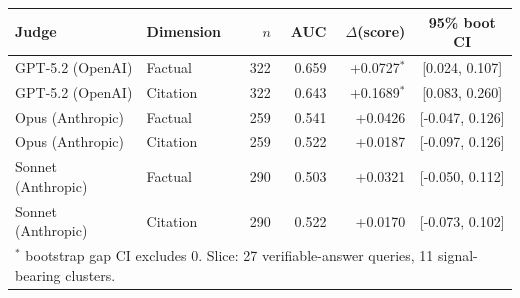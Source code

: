 \begin{tabular}{llrrrc}
\toprule
Judge & Dimension & $n$ & AUC & $\Delta$(score) & 95\% boot CI\\
\midrule
GPT-5.2 (OpenAI) & Factual & 322 & 0.659 & +0.0727$^{*}$ & [0.024, 0.107] \\
GPT-5.2 (OpenAI) & Citation & 322 & 0.643 & +0.1689$^{*}$ & [0.083, 0.260] \\
Opus (Anthropic) & Factual & 259 & 0.541 & +0.0426 & [-0.047, 0.126] \\
Opus (Anthropic) & Citation & 259 & 0.522 & +0.0187 & [-0.097, 0.126] \\
Sonnet (Anthropic) & Factual & 290 & 0.503 & +0.0321 & [-0.050, 0.112] \\
Sonnet (Anthropic) & Citation & 290 & 0.522 & +0.0170 & [-0.073, 0.102] \\
\bottomrule
\multicolumn{6}{l}{\footnotesize $^{*}$ bootstrap gap CI excludes 0. Slice: 27 verifiable-answer queries, 11 signal-bearing clusters.} \\
\end{tabular}
